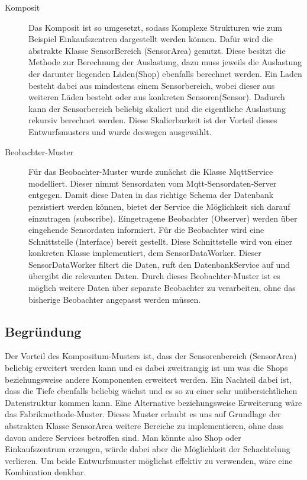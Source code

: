 \documentclass[runningheads]{llncs}
\begin{document}
\begin{description}
\item[Komposit]
Das Komposit ist so umgesetzt, sodass Komplexe Strukturen wie zum Beispiel Einkaufszentren dargestellt werden können.
Dafür wird die abstrakte Klasse SensorBereich (SensorArea) genutzt. Diese besitzt die Methode zur Berechnung der Auslastung, dazu muss jeweils die Auslastung der darunter liegenden Läden(Shop) ebenfalls berechnet werden.
Ein Laden besteht dabei aus mindestens einem Sensorbereich, wobei dieser aus weiteren Läden besteht oder aus konkreten Sensoren(Sensor).
Dadurch kann der Sensorbereich beliebig skaliert und die eigentliche Auslastung rekursiv berechnet werden.  
Diese Skalierbarkeit ist der Vorteil dieses Entwurfsmusters und wurde deswegen ausgewählt. 
\item[Beobachter-Muster]
Für das Beobachter-Muster wurde zunächst die Klasse MqttService modelliert. 
Dieser nimmt Sensordaten vom Mqtt-Sensordaten-Server entgegen.
Damit diese Daten in das richtige Schema der Datenbank persistiert werden können, bietet der Service die Möglichkeit sich darauf einzutragen (subscribe).
Eingetragene Beobachter (Observer) werden über eingehende Sensordaten informiert.
Für die Beobachter wird eine Schnittstelle (Interface) bereit gestellt.
Diese Schnittstelle wird von einer konkreten Klasse implementiert, dem SensorDataWorker.
Dieser SensorDataWorker filtert die Daten, ruft den DatenbankService auf und übergibt die relevanten Daten.
Durch dieses Beobachter-Muster ist es möglich weitere Daten über separate Beobachter zu verarbeiten, ohne das bisherige Beobachter angepasst werden müssen.
\end{description}


\subsection{Begründung}
Der Vorteil des Kompositum-Musters ist, dass der Sensorenbereich (SensorArea) beliebig erweitert werden kann und es dabei zweitrangig ist um was die Shops beziehungsweise andere Komponenten erweitert werden. 
Ein Nachteil dabei ist, dass die Tiefe ebenfalls beliebig wächst und es so zu einer sehr unübersichtlichen Datenstruktur kommen kann.
Eine Alternative beziehungsweise Erweiterung wäre das Fabrikmethode-Muster. 
Dieses Muster erlaubt es uns auf Grundlage der abstrakten Klasse SensorArea weitere Bereiche zu implementieren, ohne dass davon andere Services betroffen sind. 
Man könnte also Shop oder Einkaufszentrum erzeugen, würde dabei aber die Möglichkeit der Schachtelung verlieren. 
Um beide Entwurfsmuster möglichst effektiv zu verwenden, wäre eine Kombination denkbar.
\\
\end{document}
